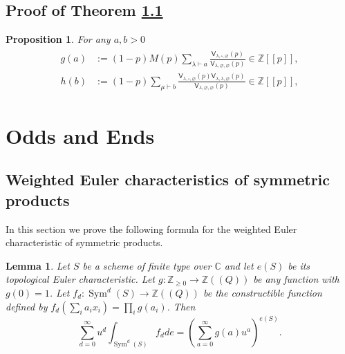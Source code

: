 \documentclass{amsart}
\newtheorem{proposition}[theorem]{Proposition}
\newtheorem{lemma}[theorem]{Lemma}
\theoremstyle{definition}
\newcommand{\CC} {\mathbb{C}}          %
\newcommand{\ZZ} {\mathbb{Z}}		%
\newcommand{\sfV}{\mathsf{V}}
\newcommand{\Sym}{\operatorname{Sym}}
\begin{document}
\subsection{Proof of Theorem \ref{}}

\begin{proposition}
For any $a,b>0$ 
\begin{align}
\begin{split} \label{gh}
g(a) &:= (1-p) M(p) \sum_{\lambda \vdash a} \frac{\sfV_{\lambda,\square,\varnothing}(p)}{\sfV_{\lambda,\varnothing,\varnothing}(p)} \in \ZZ[\![p]\!], \\
h(b) &:= (1-p) \sum_{\mu \vdash b} \frac{\sfV_{\lambda,\square,\varnothing}(p) \sfV_{\lambda,\lambda,\varnothing}(p)}{\sfV_{\lambda,\varnothing,\varnothing}(p)}  \in \ZZ[\![p]\!],
\end{split}
\end{align}
\end{proposition}


\appendix
\section{Odds and Ends}\label{appendix: odds and ends}


\subsection{Weighted Euler characteristics of symmetric products}

In this section we prove the following formula for the weighted Euler
characteristic of symmetric products.

\begin{lemma}\label{lem: formula for euler char of sym products}
Let $S$ be a scheme of finite type over $\CC $ and let $e (S)$ be its
topological Euler characteristic. Let $g:\ZZ _{\geq 0}\to \ZZ ((Q))$
be any function with $g (0)=1$. Let $f_{d}:\Sym ^{d} (S)\to \ZZ ((Q))$
be the constructible function defined by $f_{d} (\sum_{i}
a_{i}x_{i})=\prod _{i}g (a_{i})$. Then
\[
\sum _{d=0}^{\infty } u^{d} \int _{\Sym ^{d} (S)} f_{d} de =
\left(\sum _{a=0}^{\infty }g (a) u^{a} \right)^{e (S)}.
\]
\end{lemma}
\end{document}
